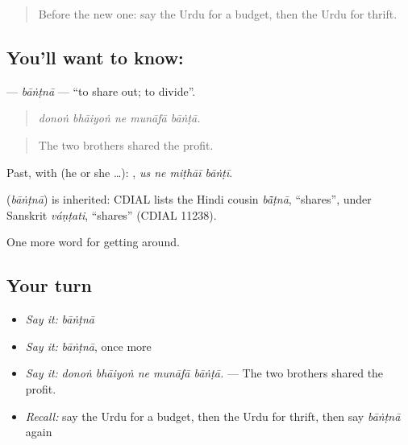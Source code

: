 \label{lesson:UR-C420-bantna}



\begin{quote}
Before the new one: say the Urdu for a budget, then the Urdu for thrift.
\end{quote}

\subsection*{You'll want to know: }
\textbf{} — \emph{bāṅṭnā} — \textquotedblleft{}to share out; to divide\textquotedblright{}.

\begin{quote}
    
\end{quote}

\begin{quote}
\emph{donoṅ bhāiyoṅ ne munāfā bāṅṭā.}
\end{quote}

\begin{quote}
The two brothers shared the profit.
\end{quote}

Past, with  (he or she …):    , \emph{us ne miṭhāī bāṅṭī}.

\begin{cousinweb}
\textbf{} (\emph{bāṅṭnā}) is inherited: CDIAL lists the Hindi cousin \emph{bā̃ṭnā}, \textquotedblleft{}shares\textquotedblright{}, under Sanskrit \emph{váṇṭati}, \textquotedblleft{}shares\textquotedblright{} (CDIAL 11238).
\end{cousinweb}

\begin{grammarlens}[title={What you've built}]
One more word for getting around.
\end{grammarlens}

\subsection*{Your turn}
\begin{itemize}
\raggedright
  \item \emph{Say it:} \emph{bāṅṭnā}
  \item \emph{Say it:} \emph{bāṅṭnā}, once more
  \item \emph{Say it:} \emph{donoṅ bhāiyoṅ ne munāfā bāṅṭā.} — The two brothers shared the profit.
  \item \emph{Recall:} say the Urdu for a budget, then the Urdu for thrift, then say \emph{bāṅṭnā} again
\end{itemize}

